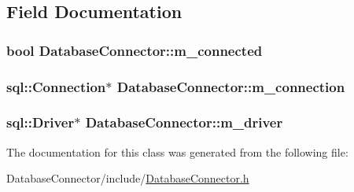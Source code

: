 \subsection{Field Documentation}
\hypertarget{classDatabaseConnector_aa6eff9e87635230d6b6aaa675312aaf1}{
\subsubsection[{m\_\-connected}]{\setlength{\rightskip}{0pt plus 5cm}bool {\bf DatabaseConnector::m\_\-connected}}}
\label{classDatabaseConnector_aa6eff9e87635230d6b6aaa675312aaf1}
\hypertarget{classDatabaseConnector_a82c3e58f461abecf645352205dc7d83d}{
\subsubsection[{m\_\-connection}]{\setlength{\rightskip}{0pt plus 5cm}sql::Connection$\ast$ {\bf DatabaseConnector::m\_\-connection}}}
\label{classDatabaseConnector_a82c3e58f461abecf645352205dc7d83d}
\hypertarget{classDatabaseConnector_aacae9f4fcb377b458e210f8aa87d0759}{
\subsubsection[{m\_\-driver}]{\setlength{\rightskip}{0pt plus 5cm}sql::Driver$\ast$ {\bf DatabaseConnector::m\_\-driver}}}
\label{classDatabaseConnector_aacae9f4fcb377b458e210f8aa87d0759}


The documentation for this class was generated from the following file:\begin{DoxyCompactItemize}
\item 
DatabaseConnector/include/\hyperlink{DatabaseConnector_8h}{DatabaseConnector.h}\end{DoxyCompactItemize}
